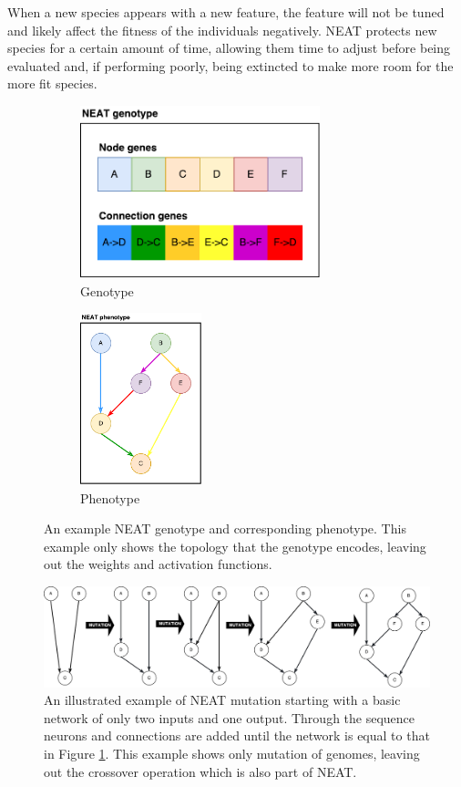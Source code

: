 When a new species appears with a new feature,
the feature will not be tuned and likely affect the fitness of the individuals negatively.
NEAT protects new species for a certain amount of time,
allowing them time to adjust before being evaluated and, if performing poorly, being extincted to make more room for the more fit species.

\begin{figure}
\centering
\begin{subfigure}[t]{.5\columnwidth}
\centering
\includegraphics[height=5cm, keepaspectratio]{fig/NEAT_gt}
\caption{Genotype}
\end{subfigure}\hfill%
\begin{subfigure}[t]{.5\columnwidth}
\centering
\includegraphics[height=5cm, keepaspectratio]{fig/NEAT_pt}
\caption{Phenotype}
\end{subfigure}

\caption[Example NEAT genotype and phenotype]{
An example NEAT genotype and corresponding phenotype.
This example only shows the topology that the genotype encodes, leaving out the weights and activation functions.
}
\label{fig:neat}
\end{figure}

\begin{figure}
\centering
\includegraphics[width=\columnwidth, keepaspectratio]{fig/NEAT_mutation}
\caption[Example of NEAT mutation]{
    An illustrated example of NEAT mutation starting with a basic network of only two inputs and one output.
    Through the sequence neurons and connections are added until the network is equal to that in Figure \ref{fig:neat}.
    This example shows only mutation of genomes, leaving out the crossover operation which is also part of NEAT.
    }
\label{fig:neat_mutation}
\end{figure}



